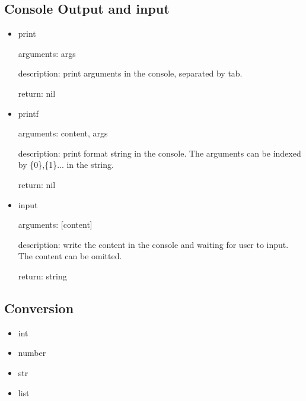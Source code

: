 \documentclass[]{article}
\begin{document}
\subsection{Console Output and input}

\begin{itemize}
	\item print
	
		arguments: args
		
		description: print arguments in the console, separated by tab.
		
		return: nil
	\item printf
	
	arguments: content, args
	
	description: print format string in the console. The arguments can be indexed by \{0\},\{1\}... in the string.
	
	return: nil
	\item input
	
	arguments: [content]
		
	description: write the content in the console and waiting for user to input. The content can be omitted.
		
	return: string
\end{itemize}


\subsection{Conversion}
\begin{itemize}
	\item int
	\item number
	\item str
	\item list
\end{itemize}
\end{document}
